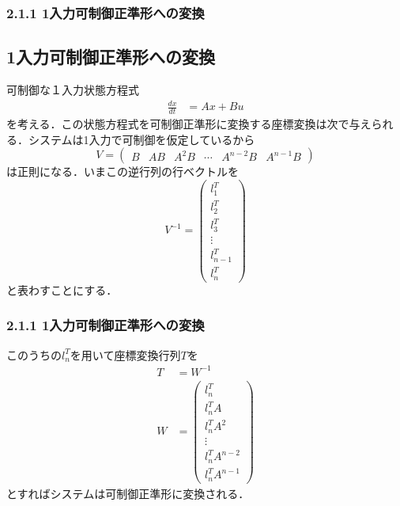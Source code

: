 \begin{frame}[t]
\frametitle{2.1.1 1入力可制御正準形への変換}

\subsection{1入力可制御正準形への変換}

可制御な１入力状態方程式
\begin{align}
 \frac{dx}{dt} &= Ax + Bu
\nonumber
\end{align}
を考える．この状態方程式を可制御正準形に変換する座標変換は次で与えられる．システムは1入力で可制御を仮定しているから
\begin{equation}
 V = \left(\begin{array}{cccccc}
            B & A B & A^2 B & \cdots & A^{n-2} B & A^{n-1} B
	   \end{array}\right)
\end{equation}
は正則になる．いまこの逆行列の行ベクトルを
\begin{equation}
 V^{-1} = \left(\begin{array}{c}
	     l_1^T \\
		 l_2^T \\
		 l_3^T \\
		 \vdots \\
		 l_{n-1}^T \\
		 l_n^T
		\end{array}\right)
\end{equation}
と表わすことにする．


\end{frame}

\begin{frame}[t]
\frametitle{2.1.1 1入力可制御正準形への変換}

このうちの$l_n^T$を用いて座標変換行列$T$を
\begin{align}
 T &= W^{-1} \\
 W &= \left(\begin{array}{c}
	      l_n^T     \\
	      l_n^T A   \\
	      l_n^T A^2 \\
	      \vdots    \\
	      l_n^T A^{n-2} \\
	      l_n^T A^{n-1}
	     \end{array}\right)
\end{align}
とすればシステムは可制御正準形に変換される．
\end{frame}

